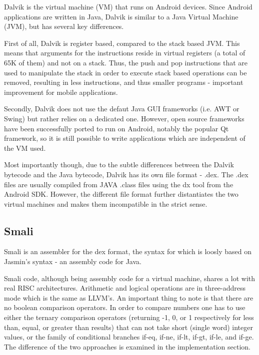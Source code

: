 \documentclass[parskip]{cs4rep}
\begin{document}
Dalvik is the virtual machine (VM) that runs on Android devices. Since Android applications are written in Java, Dalvik is similar to a Java Virtual Machine (JVM), but has several key differences.

First of all, Dalvik is register based, compared to the stack based JVM. This means that arguments for the instructions reside in virtual registers (a total of 65K of them) and not on a stack. Thus, the push and pop instructions that are used to manipulate the stack in order to execute stack based operations can be removed, resulting in less instructions, and thus smaller programs - important improvement for mobile applications.

Secondly, Dalvik does not use the defaut Java GUI frameworks (i.e. AWT or Swing) but rather relies on a dedicated one. However, open source frameworks have been successfully ported to run on Android, notably the popular Qt framework, so it is still possible to write applications which are independent of the VM  used.

Most importantly though, due to the subtle differences between the Dalvik bytecode and the Java bytecode, Dalvik has its own file format - .dex. The .dex files are usually compiled from JAVA .class files using the dx tool from the Android SDK. However, the different file format further distantiates the two virtual machines and makes them incompatible in the strict sense.

\subsection{Smali}

Smali is an assembler for the dex format, the syntax for which is loosly based on Jasmin's syntax - an assembly code for Java\cite{GoogleProjectHosting2013}.

Smali code, although being assembly code for a virtual machine, shares a lot with real RISC architectures. Arithmetic and logical operations are in three-address mode\cite{TheAndroidOpenSourceProject2007} which is the same as LLVM's. An important thing to note is that there are no boolean comparison operators. In order to compare numbers one has to use either the ternary comparison operators (returning -1, 0, or 1 respectively for less than, equal, or greater than results) that can not take short (single word) integer values, or the family of conditional branches if-eq, if-ne, if-lt, if-gt, if-le, and if-ge. The difference of the two approaches is examined in the implementation section.
\end{document}
